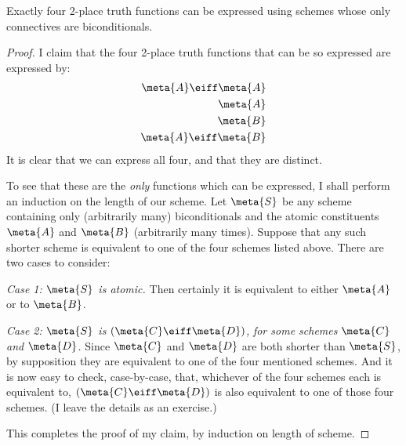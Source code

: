 	\begin{prop}\label{prop:Eiff4}
		Exactly four 2-place truth functions can be expressed using schemes whose only connectives are biconditionals.
		\begin{proof}
			I claim that the four 2-place truth functions that can be so expressed are expressed by:
			\begin{align*}
				\meta{A} \eiff \meta{A}\\
				\meta{A}\\
				\meta{B}\\
				\meta{A} \eiff \meta{B}
			\end{align*}
			It is clear that we can express all four, and that they are distinct. 
			
			To see that these are the \emph{only} functions which can be expressed, I shall perform an induction on the length of our scheme. Let $\meta{S}$ be any scheme containing only (arbitrarily many) biconditionals and the atomic constituents $\meta{A}$ and $\meta{B}$ (arbitrarily many times). Suppose that any such shorter scheme is equivalent to one of the four schemes listed above. There are two cases to consider:
			\begin{ebullet}
				\item[\emph{Case 1: $\meta{S}$ is atomic.}] Then certainly it is equivalent to either $\meta{A}$ or to $\meta{B}$. 
				\item[\emph{Case 2: $\meta{S}$ is $(\meta{C} \eiff \meta{D})$,}]\emph{for some schemes $\meta{C}$ and $\meta{D}$.} Since $\meta{C}$ and $\meta{D}$ are both shorter than $\meta{S}$, by supposition they are  equivalent to one of the four mentioned schemes. And it is now easy to check, case-by-case, that, whichever of the four schemes each is  equivalent to, $(\meta{C} \eiff \meta{D})$ is also equivalent to one of those four schemes. (I leave the details as an exercise.)
			\end{ebullet}
		This completes the proof of my claim, by induction on length of scheme. 
		\end{proof}
	\end{prop}
